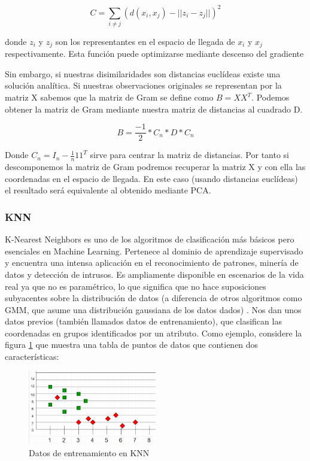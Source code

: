 \documentclass{article}
\begin{document}
\[C=\sum_{i \neq j}^{}(d(x_i,x_j)-||z_i-z_j||)^2\]

donde $z_i$ y $z_j$ son los representantes en el espacio de llegada de $x_i$ y $x_j$ respectivamente.
Esta función puede optimizarse mediante descenso del gradiente

Sin embargo, si nuestras disimilaridades son distancias euclídeas existe una solución analítica. Si nuestras observaciones originales se representan por la matriz X sabemos que la matriz de Gram se define como $B = XX^T$. Podemos obtener la matriz de Gram mediante nuestra matriz de distancias al cuadrado D.

\[B=\frac{-1}{2} * C_n * D * C_n\]

Donde $C_n = I_n - \frac{1}{n} 11^T$ sirve para centrar la matriz de distancias. Por tanto si descomponemos la matriz de Gram podremos recuperar la matriz X y con ella las coordenadas en el espacio de llegada. En este caso (usando distancias euclídeas) el resultado será equivalente al obtenido mediante PCA.

\subsubsection{KNN}
K-Nearest Neighbors es uno de los algoritmos de clasificación más básicos pero esenciales en Machine Learning. Pertenece al dominio de aprendizaje supervisado y encuentra una intensa aplicación en el reconocimiento de patrones, minería de datos y detección de intrusos.
Es ampliamente disponible en escenarios de la vida real ya que no es paramétrico, lo que significa que no hace suposiciones subyacentes sobre la distribución de datos (a diferencia de otros algoritmos como GMM, que asume una distribución gaussiana de los datos dados) .
Nos dan unos datos previos (también llamados datos de entrenamiento), que clasifican las coordenadas en grupos identificados por un atributo.
Como ejemplo, considere la figura \ref{fig:knn_01} que muestra una tabla de puntos de datos que contienen dos características:

\begin{figure}[h!]
	\centering
	\includegraphics[width=0.5\textwidth]{img/knn_01.png}
	\caption{Datos de entrenamiento en KNN}
	\label{fig:knn_01}
\end{figure}
\end{document}

